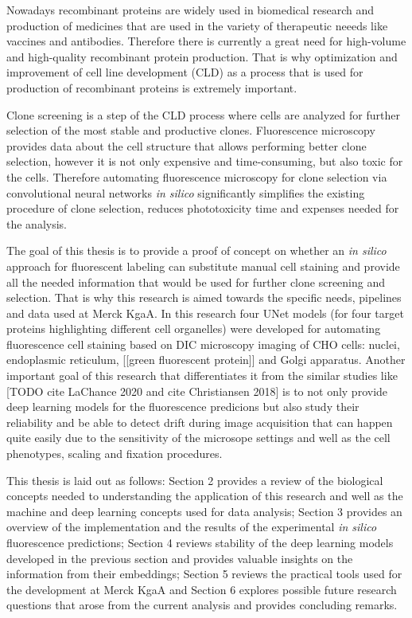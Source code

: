 Nowadays recombinant proteins are widely used in biomedical research and production of medicines that are used in the variety of therapeutic neeeds like vaccines and antibodies. Therefore there is currently a great need for high-volume and high-quality recombinant protein production. That is why optimization and improvement of cell line development (CLD) as a process that is used for production of recombinant proteins is extremely important.

Clone screening is a step of the CLD process where cells are analyzed for further selection of the most stable and productive clones. Fluorescence microscopy provides data about the cell structure that allows performing better clone selection, however it is not only expensive and time-consuming, but also toxic for the cells. Therefore automating fluorescence microscopy for clone selection via convolutional neural networks \textit{in silico} significantly simplifies the existing procedure of clone selection, reduces phototoxicity time and expenses needed for the analysis.

The goal of this thesis is to provide a proof of concept on whether an \textit{in silico} approach for fluorescent labeling can substitute manual cell staining and provide all the needed information that would be used for further clone screening and selection. That is why this research is aimed towards the specific needs, pipelines and data used at Merck KgaA. In this research four UNet models (for four target proteins highlighting different cell organelles) were developed for automating fluorescence cell staining based on DIC microscopy imaging of CHO cells: nuclei, endoplasmic reticulum, [[green fluorescent protein]] and Golgi apparatus. Another important goal of this research that differentiates it from the similar studies like [TODO cite LaChance 2020 and cite Christiansen 2018] is to not only provide deep learning models for the fluorescence predicions but also study their reliability and be able to detect drift during image acquisition that can happen quite easily due to the sensitivity of the microsope settings and well as the cell phenotypes, scaling and fixation procedures.

This thesis is laid out as follows: Section 2 provides a review of the biological concepts needed to understanding the application of this research and well as the machine and deep learning concepts used for data analysis; Section 3 provides an overview of the implementation and the results of the experimental \textit{in silico} fluorescence predictions; Section 4 reviews stability of the deep learning models developed in the previous section and provides valuable insights on the information from their embeddings; Section 5 reviews the practical tools used for the development at Merck KgaA and Section 6 explores possible future research questions that arose from the current analysis and provides concluding remarks.
